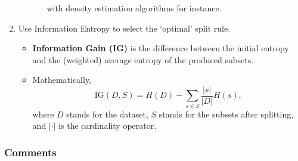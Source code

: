 \documentclass[twocolumn,landscape,10pt]{article}
\theoremstyle{definition}
\begin{document}
\begin{enumerate}
\begin{itemize}
\begin{itemize}
                        with density estimation algorithms for instance.
                \end{itemize} 
        \end{itemize} 
    \item Use Information Entropy to select the `optimal' split rule.
        \begin{itemize}
            \item \textbf{Information Gain (IG)} is the difference between the
                initial entropy and the (weighted) average entropy of the
                produced subsets.
            \item Mathematically,
                \[
                    \text{IG}(D, S) = H(D) - \sum_{s\in S} \frac{|s|}{|D|}H(s),
                \]
                where $D$ stands for the dataset, $S$ stands for the subsets
                after splitting, and $|\cdot|$ is the cardinality operator.
        \end{itemize} 
\end{enumerate} 

\subsubsection{Comments}
\end{document}
